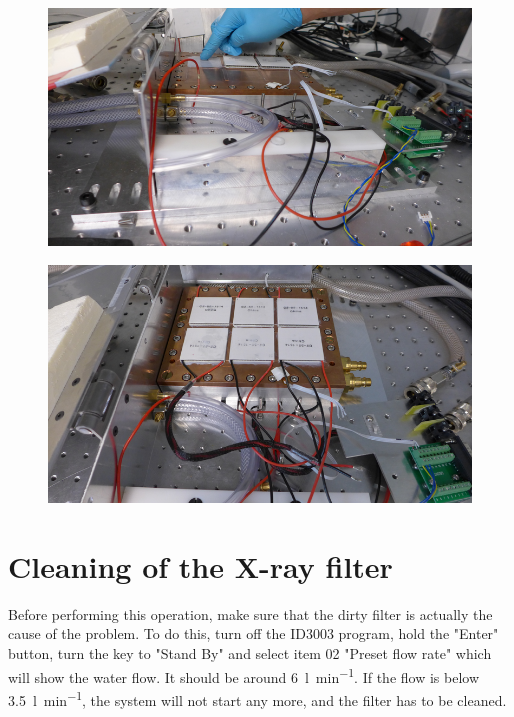 \documentclass[a4paper,12pt,twoside]{article}
\begin{document}
\begin{appendices}
\begin{figure} [h!]
\centering
\begin{minipage}{.48\textwidth}
  \centering
  \includegraphics[width=\textwidth]{./Figures/Point9a.png}
  \label{Step9a}
\end{minipage}%
\hspace{2mm}
\begin{minipage}{.48\textwidth}
  \centering
  \includegraphics[width=\textwidth]{./Figures/Point9b.png}
  \label{Step9b}
\end{minipage}
\end{figure}
\clearpage
\newpage
\section{Cleaning of the X-ray filter} \label{Filter}

Before performing this operation, make sure that the dirty filter is actually the cause of the problem. To do this, turn off the ID3003 program, hold the "Enter" button, turn the key to "Stand By" and select item 02 "Preset flow rate" which will show the water flow. It should be around \SI{6}{\litre\per\minute}. If the flow is below \SI{3.5}{\litre\per\minute}, the system will not start any more, and the filter has to be cleaned.
\\


\end{appendices}
\end{document}
